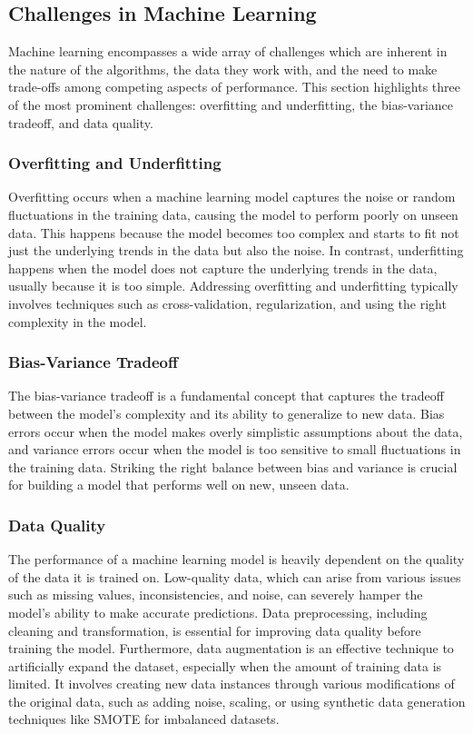 \subsection{Challenges in Machine Learning}

Machine learning encompasses a wide array of challenges which are inherent in the nature of the algorithms, the data they work with, and the need to make trade-offs among competing aspects of performance. This section highlights three of the most prominent challenges: overfitting and underfitting, the bias-variance tradeoff, and data quality.

\subsubsection{Overfitting and Underfitting}
Overfitting occurs when a machine learning model captures the noise or random fluctuations in the training data, causing the model to perform poorly on unseen data. This happens because the model becomes too complex and starts to fit not just the underlying trends in the data but also the noise. In contrast, underfitting happens when the model does not capture the underlying trends in the data, usually because it is too simple. Addressing overfitting and underfitting typically involves techniques such as cross-validation, regularization, and using the right complexity in the model.

\subsubsection{Bias-Variance Tradeoff}
The bias-variance tradeoff is a fundamental concept that captures the tradeoff between the model's complexity and its ability to generalize to new data. Bias errors occur when the model makes overly simplistic assumptions about the data, and variance errors occur when the model is too sensitive to small fluctuations in the training data. Striking the right balance between bias and variance is crucial for building a model that performs well on new, unseen data.

\subsubsection{Data Quality}
The performance of a machine learning model is heavily dependent on the quality of the data it is trained on. Low-quality data, which can arise from various issues such as missing values, inconsistencies, and noise, can severely hamper the model's ability to make accurate predictions. Data preprocessing, including cleaning and transformation, is essential for improving data quality before training the model. Furthermore, data augmentation is an effective technique to artificially expand the dataset, especially when the amount of training data is limited. It involves creating new data instances through various modifications of the original data, such as adding noise, scaling, or using synthetic data generation techniques like SMOTE for imbalanced datasets.

